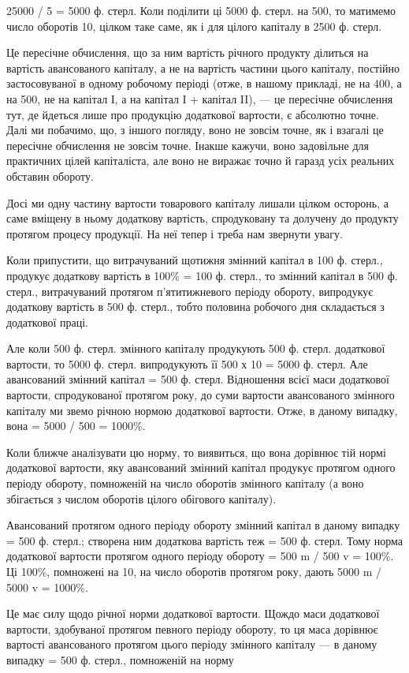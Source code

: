 25000 / 5 = 5000 ф. стерл. Коли поділити ці 5000 ф. стерл. на 500, то матимемо число оборотів 10,
цілком таке саме, як і для цілого капіталу в 2500 ф. стерл.

Це пересічне обчислення, що за ним вартість річного продукту ділиться на вартість авансованого
капіталу, а не на вартість частини цього капіталу, постійно застосовуваної в одному робочому періоді
(отже, в нашому прикладі, не на 400, а на 500, не на капітал І, а на капітал І + капітал II), — це
пересічне обчислення тут, де йдеться лише про продукцію додаткової вартости, є абсолютно точне. Далі
ми побачимо, що, з іншого погляду, воно не зовсім точне, як і взагалі це пересічне обчислення не
зовсім точне. Інакше кажучи, воно задовільне для практичних цілей капіталіста,
але воно не виражає точно й гаразд усіх реальних обставин обороту.

Досі ми одну частину вартости товарового капіталу лишали цілком осторонь, а саме вміщену в ньому
додаткову вартість, спродуковану та долучену до продукту протягом процесу продукції. На неї тепер і
треба нам звернути увагу.

Коли припустити, що витрачуваний щотижня змінний капітал в 100 ф. стерл., продукує додаткову
вартість в 100\% = 100 ф. стерл., то змінний капітал в 500 ф. стерл.,  витрачуваний протягом
п’ятитижневого періоду обороту, випродукує додаткову вартість в 500 ф. стерл., тобто половина
робочого дня складається з додаткової праці.

Але коли 500 ф. стерл. змінного капіталу продукують 500 ф. стерл. додаткової вартости, то 5000 ф.
стерл. випродукують її 500 х 10 = 5000 ф. стерл. Але авансований змінний капітал = 500 ф. стерл.
Відношення всієї маси додаткової вартости, спродукованої протягом року, до суми вартости
авансованого змінного капіталу ми звемо річною нормою додаткової вартости. Отже, в даному випадку,
вона = 5000 / 500 = 1000\%.

Коли ближче аналізувати цю норму, то виявиться, що вона дорівнює тій нормі додаткової вартости, яку
авансований змінний капітал продукує протягом одного періоду обороту, помноженій на число оборотів
змінного капіталу (а воно збігається з числом оборотів цілого обігового капіталу).

Авансований протягом одного періоду обороту змінний капітал в даному випадку = 500 ф. стерл.;
створена ним додаткова вартість теж = 500 ф. стерл. Тому норма додаткової вартости протягом одного
періоду обороту = 500 m / 500 v = 100\%. Ці 100\%, помножені на 10, на число оборотів протягом року,
дають 5000 m / 5000 v = 1000\%.

Це має силу щодо річної норми додаткової вартости. Щождо маси додаткової вартости, здобуваної
протягом певного періоду обороту, то ця маса дорівнює вартості авансованого протягом цього періоду
змінного капіталу — в даному випадку = 500 ф. стерл., помноженій на норму
